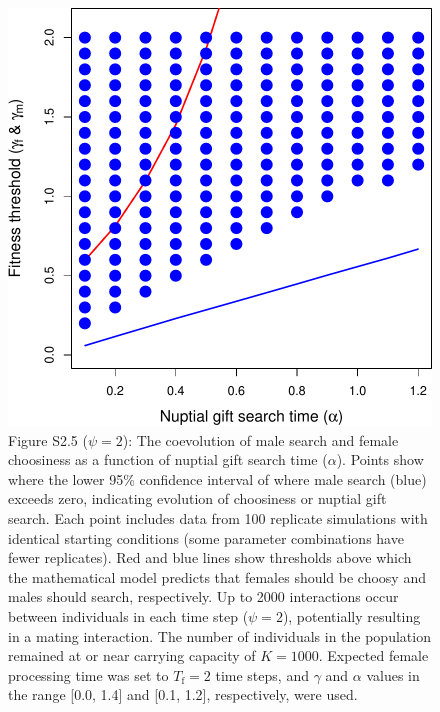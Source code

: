 \documentclass[
]{article}
\begin{document}
\clearpage

\captionsetup{labelformat=empty}

\begin{figure}
\centering
\includegraphics{SI_files/figure-latex/unnamed-chunk-6-1.pdf}
\caption{Figure S2.5 (\(\psi = 2\)): The coevolution of male search and
female choosiness as a function of nuptial gift search time
(\(\alpha\)). Points show where the lower 95\% confidence interval of
where male search (blue) exceeds zero, indicating evolution of
choosiness or nuptial gift search. Each point includes data from 100
replicate simulations with identical starting conditions (some parameter
combinations have fewer replicates). Red and blue lines show thresholds
above which the mathematical model predicts that females should be
choosy and males should search, respectively. Up to 2000 interactions
occur between individuals in each time step (\(\psi = 2\)), potentially
resulting in a mating interaction. The number of individuals in the
population remained at or near carrying capacity of \(K = 1000\).
Expected female processing time was set to \(T_{\mathrm{f}}=2\) time
steps, and \(\gamma\) and \(\alpha\) values in the range {[}0.0, 1.4{]}
and {[}0.1, 1.2{]}, respectively, were used.}
\end{figure}

\captionsetup{labelformat=default}
\end{document}
